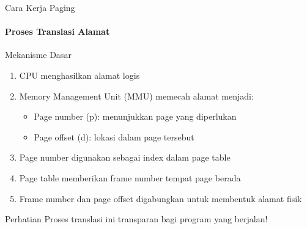 \documentclass[10pt,aspectratio=169]{beamer}
\begin{document}
\begin{frame}{Cara Kerja Paging}
    \framesubtitle{Proses Translasi Alamat}
    
    \begin{block}{Mekanisme Dasar}
        \begin{enumerate}
            \item CPU menghasilkan alamat logis
            \item Memory Management Unit (MMU) memecah alamat menjadi:
                \begin{itemize}
                    \item Page number (p): menunjukkan page yang diperlukan
                    \item Page offset (d): lokasi dalam page tersebut
                \end{itemize}
            \item Page number digunakan sebagai index dalam page table
            \item Page table memberikan frame number tempat page berada
            \item Frame number dan page offset digabungkan untuk membentuk alamat fisik
        \end{enumerate}
    \end{block}
    
    \begin{alertblock}{Perhatian}
        Proses translasi ini transparan bagi program yang berjalan!
    \end{alertblock}
\end{frame}
\end{document}
